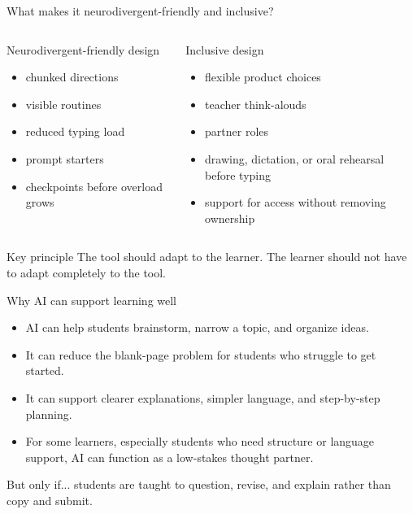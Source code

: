 \documentclass[aspectratio=169,11pt]{beamer}
\begin{document}
\begin{frame}{What makes it neurodivergent-friendly and inclusive?}
\begin{columns}[T]
  \begin{block}{Neurodivergent-friendly design}
  \begin{itemize}
    \item chunked directions
    \item visible routines
    \item reduced typing load
    \item prompt starters
    \item checkpoints before overload grows
  \end{itemize}
  \end{block}

  \begin{block}{Inclusive design}
  \begin{itemize}
    \item flexible product choices
    \item teacher think-alouds
    \item partner roles
    \item drawing, dictation, or oral rehearsal before typing
    \item support for access without removing ownership
  \end{itemize}
  \end{block}
\end{columns}

\vspace{0.2cm}
\begin{alertblock}{Key principle}
The tool should adapt to the learner. The learner should not have to adapt completely to the tool.
\end{alertblock}
\end{frame}

\begin{frame}{Why AI can support learning well}
\begin{itemize}
  \item AI can help students brainstorm, narrow a topic, and organize ideas.
  \item It can reduce the blank-page problem for students who struggle to get started.
  \item It can support clearer explanations, simpler language, and step-by-step planning.
  \item For some learners, especially students who need structure or language support, AI can function as a low-stakes thought partner.
\end{itemize}

\vspace{0.25cm}
\begin{block}{But only if...}
\large students are taught to question, revise, and explain rather than copy and submit.
\end{block}
\end{frame}
\end{document}
